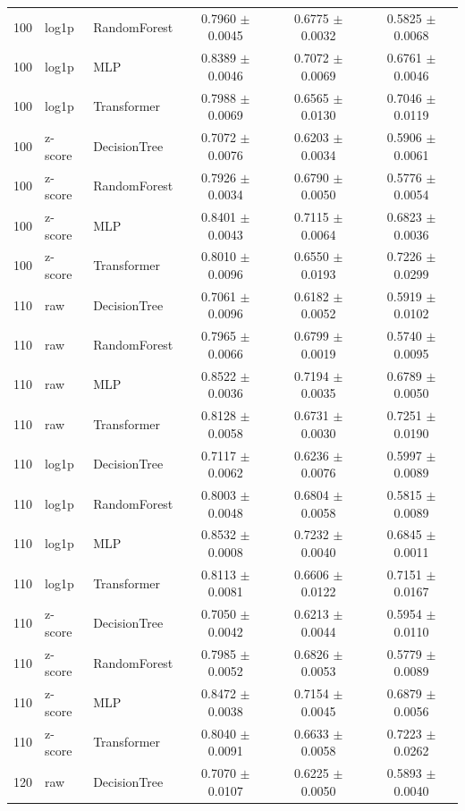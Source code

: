 \begin{longtable}{rllccc}
100 & log1p & RandomForest & 0.7960 $\pm$ 0.0045 & 0.6775 $\pm$ 0.0032 & 0.5825 $\pm$ 0.0068 \\
100 & log1p & MLP & 0.8389 $\pm$ 0.0046 & 0.7072 $\pm$ 0.0069 & 0.6761 $\pm$ 0.0046 \\
100 & log1p & Transformer & 0.7988 $\pm$ 0.0069 & 0.6565 $\pm$ 0.0130 & 0.7046 $\pm$ 0.0119 \\
100 & z-score & DecisionTree & 0.7072 $\pm$ 0.0076 & 0.6203 $\pm$ 0.0034 & 0.5906 $\pm$ 0.0061 \\
100 & z-score & RandomForest & 0.7926 $\pm$ 0.0034 & 0.6790 $\pm$ 0.0050 & 0.5776 $\pm$ 0.0054 \\
100 & z-score & MLP & 0.8401 $\pm$ 0.0043 & 0.7115 $\pm$ 0.0064 & 0.6823 $\pm$ 0.0036 \\
100 & z-score & Transformer & 0.8010 $\pm$ 0.0096 & 0.6550 $\pm$ 0.0193 & 0.7226 $\pm$ 0.0299 \\
110 & raw & DecisionTree & 0.7061 $\pm$ 0.0096 & 0.6182 $\pm$ 0.0052 & 0.5919 $\pm$ 0.0102 \\
110 & raw & RandomForest & 0.7965 $\pm$ 0.0066 & 0.6799 $\pm$ 0.0019 & 0.5740 $\pm$ 0.0095 \\
110 & raw & MLP & 0.8522 $\pm$ 0.0036 & 0.7194 $\pm$ 0.0035 & 0.6789 $\pm$ 0.0050 \\
110 & raw & Transformer & 0.8128 $\pm$ 0.0058 & 0.6731 $\pm$ 0.0030 & 0.7251 $\pm$ 0.0190 \\
110 & log1p & DecisionTree & 0.7117 $\pm$ 0.0062 & 0.6236 $\pm$ 0.0076 & 0.5997 $\pm$ 0.0089 \\
110 & log1p & RandomForest & 0.8003 $\pm$ 0.0048 & 0.6804 $\pm$ 0.0058 & 0.5815 $\pm$ 0.0089 \\
110 & log1p & MLP & 0.8532 $\pm$ 0.0008 & 0.7232 $\pm$ 0.0040 & 0.6845 $\pm$ 0.0011 \\
110 & log1p & Transformer & 0.8113 $\pm$ 0.0081 & 0.6606 $\pm$ 0.0122 & 0.7151 $\pm$ 0.0167 \\
110 & z-score & DecisionTree & 0.7050 $\pm$ 0.0042 & 0.6213 $\pm$ 0.0044 & 0.5954 $\pm$ 0.0110 \\
110 & z-score & RandomForest & 0.7985 $\pm$ 0.0052 & 0.6826 $\pm$ 0.0053 & 0.5779 $\pm$ 0.0089 \\
110 & z-score & MLP & 0.8472 $\pm$ 0.0038 & 0.7154 $\pm$ 0.0045 & 0.6879 $\pm$ 0.0056 \\
110 & z-score & Transformer & 0.8040 $\pm$ 0.0091 & 0.6633 $\pm$ 0.0058 & 0.7223 $\pm$ 0.0262 \\
120 & raw & DecisionTree & 0.7070 $\pm$ 0.0107 & 0.6225 $\pm$ 0.0050 & 0.5893 $\pm$ 0.0040 \\

\end{longtable}

